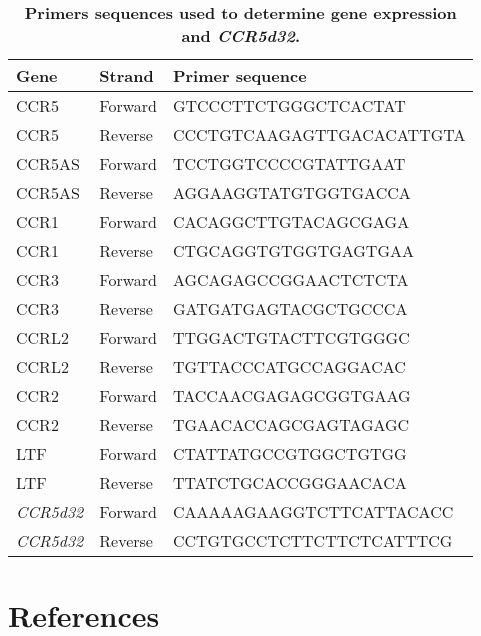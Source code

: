 \documentclass{book}
\begin{document}
\begin{refsection}
\newpage
\begin{table}[H] %
  \begin{tabular}{lll}
    \hline
    Gene & Strand & Primer sequence \\
    \hline
    CCR5 & Forward & GTCCCTTCTGGGCTCACTAT \\
    CCR5 & Reverse & CCCTGTCAAGAGTTGACACATTGTA \\
    CCR5AS & Forward & TCCTGGTCCCCGTATTGAAT \\
    CCR5AS & Reverse & AGGAAGGTATGTGGTGACCA \\
    CCR1 & Forward & CACAGGCTTGTACAGCGAGA \\
    CCR1 & Reverse & CTGCAGGTGTGGTGAGTGAA \\
    CCR3 & Forward & AGCAGAGCCGGAACTCTCTA \\
    CCR3 & Reverse & GATGATGAGTACGCTGCCCA \\
    CCRL2 & Forward & TTGGACTGTACTTCGTGGGC \\
    CCRL2 & Reverse & TGTTACCCATGCCAGGACAC \\
    CCR2 & Forward & TACCAACGAGAGCGGTGAAG \\
    CCR2 & Reverse & TGAACACCAGCGAGTAGAGC \\
    LTF & Forward & CTATTATGCCGTGGCTGTGG \\
    LTF & Reverse & TTATCTGCACCGGGAACACA \\
    \textit{CCR5d32} & Forward & CAAAAAGAAGGTCTTCATTACACC \\
    \textit{CCR5d32} & Reverse & CCTGTGCCTCTTCTTCTCATTTCG \\
    \hline
  \end{tabular}
  \caption{\label{tab:chp5suptab3} \textbf{Primers sequences used to determine gene expression and \textit{CCR5d32}.}}
\end{table}


\section*{References}
\printbibliography[heading=none]

\clearpage

\end{refsection}
\end{document}
